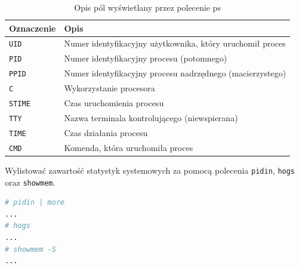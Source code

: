 \documentclass[11pt,twoside,a4paper]{article}
\begin{document}
\begin{example}
\begin{table}[h!]
\centering
\caption{Opis pól wyświetlany przez polecenie ps}
\setlength{\arrayrulewidth}{1pt}
\setlength{\tabcolsep}{6pt}
\renewcommand{\arraystretch}{1.2}
\begin{tabular}{ |p{}|p{}|}
\hline \rowcolor{gray}
\textbf{Oznaczenie} & \textbf{Opis} \\ \hline
\mbox{\lstinline{UID}} & Numer identyfikacyjny użytkownika, który uruchomił proces \\ \hline 
\mbox{\lstinline{PID}} & Numer identyfikacyjny procesu (potomnego) \\ \hline 
\mbox{\lstinline{PPID}}  & Numer identyfikacyjny procesu nadrzędnego (macierzystego) \\ \hline
\mbox{\lstinline{C}}  & Wykorzystanie procesora \\ \hline
\mbox{\lstinline{STIME}}  & Czas uruchomienia procesu \\ \hline
\mbox{\lstinline{TTY}}  & Nazwa terminala kontrolującego (niewspierana) \\ \hline
\mbox{\lstinline{TIME}}  & Czas działania procesu \\ \hline
\mbox{\lstinline{CMD}}  & Komenda, która uruchomiła proces \\ \hline
\end{tabular}
\label{tab:opispol}
\end{table}

Wylistować zawartość statystyk systemowych za pomocą polecenia \lstinline{pidin}, \lstinline{hogs} oraz \lstinline{showmem}. 

\begin{lstlisting}[language=bash,deletekeywords={ps}] 
# pidin | more
... 
# hogs
...
# showmem -S
...
\end{lstlisting}

\end{example} 
\end{document}
